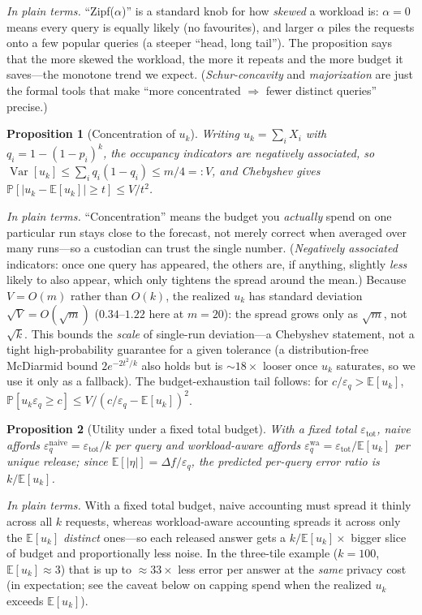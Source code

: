 \documentclass[sigconf,nonacm]{acmart}
\newcommand{\eps}{\varepsilon}
\newcommand{\E}{\mathbb{E}}
\newcommand{\Prob}{\mathbb{P}}
\DeclareMathOperator{\Var}{Var}
\newtheorem{prop}{Proposition}
\begin{document}
\noindent\emph{In plain terms.} ``Zipf($\alpha$)'' is a standard knob for how \emph{skewed} a workload is: $\alpha{=}0$ means every query is equally likely (no favourites), and larger $\alpha$ piles the requests onto a few popular queries (a steeper ``head, long tail''). The proposition says that the more skewed the workload, the more it repeats and the more budget it saves---the monotone trend we expect. (\emph{Schur-concavity} and \emph{majorization} are just the formal tools that make ``more concentrated $\Rightarrow$ fewer distinct queries'' precise.)

\begin{prop}[Concentration of $u_k$]
\label{prop:conc}
Writing $u_k=\sum_iX_i$ with $q_i=1-(1-p_i)^k$, the occupancy indicators are negatively associated, so
$\Var[u_k]\le\sum_i q_i(1-q_i)\le m/4=:V$, and Chebyshev gives $\Prob[|u_k-\E[u_k]|\ge t]\le V/t^2$.
\end{prop}

\noindent\emph{In plain terms.} ``Concentration'' means the budget you \emph{actually} spend on one particular run stays close to the forecast, not merely correct when averaged over many runs---so a custodian can trust the single number. (\emph{Negatively associated} indicators: once one query has appeared, the others are, if anything, slightly \emph{less} likely to also appear, which only tightens the spread around the mean.) Because $V=O(m)$ rather than $O(k)$, the realized $u_k$ has standard deviation $\sqrt V=O(\sqrt m)$ ($0.34$--$1.22$ here at $m{=}20$): the spread grows only as $\sqrt m$, not $\sqrt k$. This bounds the \emph{scale} of single-run deviation---a Chebyshev statement, not a tight high-probability guarantee for a given tolerance (a distribution-free McDiarmid bound $2e^{-2t^2/k}$ also holds but is $\sim18\times$ looser once $u_k$ saturates, so we use it only as a fallback). The budget-exhaustion tail follows: for $c/\eps_q>\E[u_k]$, $\Prob[u_k\eps_q\ge c]\le V/(c/\eps_q-\E[u_k])^2$.

\begin{prop}[Utility under a fixed total budget]
\label{prop:util}
With a fixed total $\eps_{\mathrm{tot}}$, naive affords $\eps_q^{\mathrm{naive}}=\eps_{\mathrm{tot}}/k$ per query and workload-aware affords $\eps_q^{\mathrm{wa}}=\eps_{\mathrm{tot}}/\E[u_k]$ per unique release; since $\E[|\eta|]=\Delta f/\eps_q$, the predicted per-query error ratio is $k/\E[u_k]$.
\end{prop}

\noindent\emph{In plain terms.} With a fixed total budget, naive accounting must spread it thinly across all $k$ requests, whereas workload-aware accounting spreads it across only the $\E[u_k]$ \emph{distinct} ones---so each released answer gets a $k/\E[u_k]\times$ bigger slice of budget and proportionally less noise. In the three-tile example ($k{=}100$, $\E[u_k]{\approx}3$) that is up to ${\approx}33\times$ less error per answer at the \emph{same} privacy cost (in expectation; see the caveat below on capping spend when the realized $u_k$ exceeds $\E[u_k]$).
\end{document}
